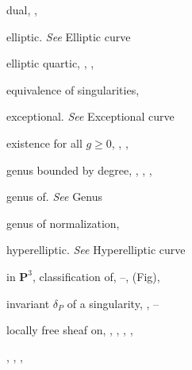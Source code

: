 {{\noindent\hspace*{7.5bp}dual, , \par
\noindent\hspace*{7.5bp}elliptic. \emph{See} Elliptic curve\par
\noindent\hspace*{7.5bp}elliptic quartic, , , \par
\noindent\hspace*{7.5bp}equivalence of singularities, \par
\noindent\hspace*{7.5bp}exceptional. \emph{See} Exceptional curve\par
\noindent\hspace*{7.5bp}existence for all $g\geqslant0$, , , \par
\noindent\hspace*{7.5bp}genus bounded by degree, , , ,\par
\noindent\hspace*{15.0bp}\par
\noindent\hspace*{7.5bp}genus of. \emph{See} Genus\par
\noindent\hspace*{7.5bp}genus of normalization, \par
\noindent\hspace*{7.5bp}hyperelliptic. \emph{See} Hyperelliptic curve\par
\noindent\hspace*{7.5bp}in $\mathbf P^3$, classification of, --,  (Fig),\par
\noindent\hspace*{15.0bp}\par
\noindent\hspace*{7.5bp}invariant $\delta_P$ of a singularity, , --\par
\noindent\hspace*{7.5bp}locally free sheaf on, , , , ,\par
\noindent\hspace*{15.0bp}, , , \par
}}
